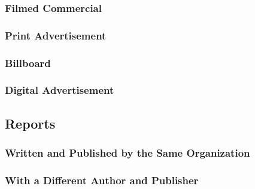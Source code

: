 \documentclass{ltxdockit}
\begin{document}
\subsubsection{Filmed Commercial} %
\label{sub:filmed_commercial}
\begin{refsection}
	\printbibliography[heading=none]
\end{refsection}
\subsubsection{Print Advertisement} %
\label{sub:print_advertisement}
\begin{refsection}
	\printbibliography[heading=none]
\end{refsection}
\subsubsection{Billboard} %
\label{sub:billboard}
\begin{refsection}
	\printbibliography[heading=none]
\end{refsection}
\subsubsection{Digital Advertisement} %
\label{sub:digital_advertisement}
\begin{refsection}
	\printbibliography[heading=none]
\end{refsection}

\subsection{Reports} %
\label{sec:reports}
\subsubsection{Written and Published by the Same Organization} %
\label{sub:written_and_published_by_the_same_organization}
\begin{refsection}
	\printbibliography[heading=none]
\end{refsection}
\subsubsection{With a Different Author and Publisher} %
\label{sub:with_a_different_author_and_publisher}
\begin{refsection}
	\printbibliography[heading=none]
\end{refsection}
\end{document}
